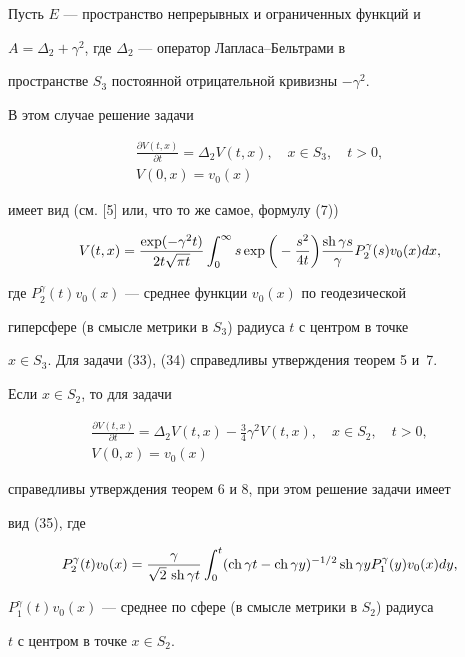 \begin{exam}


Пусть $E$ --- пространство непрерывных и ограниченных функций и


$A=\Delta_2+\gamma^2$, где $\Delta_2$ --- оператор Лапласа--Бельтрами в


пространстве $S_3$ постоянной отрицательной кривизны $-\gamma^2$.


В этом случае решение задачи


\begin{gather}


\frac{\partial V(t,x)}{ \partial t}=\Delta_2V(t,x),\quad


x\in S_3,\quad t>0,\\


V(0,x)=v_0(x)


\end{gather}


имеет вид (см. [5] или, что то же самое, формулу (7))


\begin{equation}


V(t,x)=\frac{\exp (-\gamma^2 t )}


{2t\sqrt{\pi t}} \int_0^\infty


s \exp\bigg (-\frac{s^2}{4t}\bigg ) \frac{\sh \gamma s}{\gamma}


P_2^\gamma(s)v_0(x) dx,


\end{equation}


где $P_2^\gamma(t)v_0(x)$ --- среднее функции $v_0(x)$ по геодезической


гиперсфере (в смысле метрики в $S_3$) радиуса $t$ с центром в точке


$x\in S_3$. Для задачи (33), (34) справедливы утверждения теорем 5 и~7.





Если $x\in S_2$, то для задачи


\begin{gather*}


\frac{\partial V(t,x)}{ \partial t}=\Delta_2V(t,x)-


\frac{3}{4}\gamma^2V(t,x),\quad x\in S_2,\quad t>0, \\


V(0,x)=v_0(x)


\end{gather*}


справедливы утверждения теорем 6 и 8, при этом решение задачи имеет


вид (35), где


$$


P_2^\gamma(t)v_0(x)=\frac{\gamma}{\sqrt{2}\, \sh \gamma t}


\int_0^t (\ch \gamma t-\ch \gamma y)^{-1/2}


\sh \gamma y P_1^\gamma(y)v_0(x) dy,


$$


$P_1^\gamma(t)v_0(x)$ --- среднее по сфере (в смысле метрики в $S_2$) радиуса


$t$ с центром в точке $x\in S_2$.


\end{exam}
